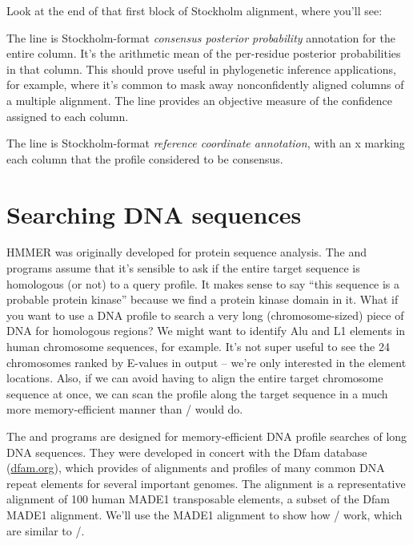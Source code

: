 Look at the end of that first block of Stockholm alignment, where you'll
see:


The  line is Stockholm-format \emph{consensus
  posterior probability} annotation for the entire column. It's the
arithmetic mean of the per-residue posterior probabilities in that
column. This should prove useful in phylogenetic inference
applications, for example, where it's common to mask away
nonconfidently aligned columns of a multiple alignment. The
 line provides an objective measure of the confidence
assigned to each column.

The  line is Stockholm-format \emph{reference
  coordinate annotation}, with an x marking each column that the
profile considered to be consensus.



\section{Searching DNA sequences}

HMMER was originally developed for protein sequence analysis. The
 and  programs assume that it's sensible
to ask if the entire target sequence is homologous (or not) to a query
profile. It makes sense to say ``this sequence is a probable protein
kinase'' because we find a protein kinase domain in it.  What if you
want to use a DNA profile to search a very long (chromosome-sized)
piece of DNA for homologous regions?  We might want to identify Alu
and L1 elements in human chromosome sequences, for example. It's not
super useful to see the 24 chromosomes ranked by E-values in
 output -- we're only interested in the element
locations. Also, if we can avoid having to align the entire target
chromosome sequence at once, we can scan the profile along the target
sequence in a much more memory-efficient manner than
/ would do.

The  and  programs are designed for
memory-efficient DNA profile searches of long DNA sequences. They were
developed in concert with the Dfam database (\url{dfam.org}), which
provides of alignments and profiles of many common DNA repeat elements
for several important genomes.  The alignment
 is a representative alignment of 100 human
MADE1 transposable elements, a subset of the Dfam MADE1
alignment. We'll use the MADE1 alignment to show how
/ work, which are similar to
/.


